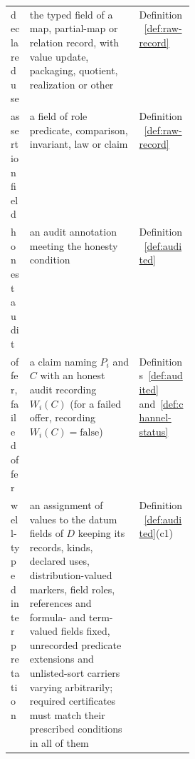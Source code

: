 \documentclass[11pt]{article}
\theoremstyle{definition}
\begin{document}
\begin{center}
\begin{tabularx}{\linewidth}{@{}l>{\raggedright\arraybackslash}X>{\raggedright\arraybackslash}p{0.30\linewidth}@{}}
declared use & the typed field of a map, partial-map or relation record, with value update, packaging, quotient, realization or other & Definition~\ref{def:raw-record} \\
assertion field & a field of role predicate, comparison, invariant, law or claim & Definition~\ref{def:raw-record} \\
honest audit & an audit annotation meeting the honesty condition & Definition~\ref{def:audited} \\
offer, failed offer & a claim naming \(P_i\) and \(C\) with an honest audit recording \(W_i(C)\) (for a failed offer, recording \(W_i(C)=\mathrm{false}\)) & Definitions~\ref{def:audited} and~\ref{def:channel-status} \\
well-typed interpretation & an assignment of values to the datum fields of \(D\) keeping its records, kinds, declared uses, distribution-valued markers, field roles, references and formula- and term-valued fields fixed, unrecorded predicate extensions and unlisted-sort carriers varying arbitrarily; required certificates must match their prescribed conditions in all of them & Definition~\ref{def:audited}(c1) \\
\bottomrule
\end{tabularx}
\end{center}
\end{document}
